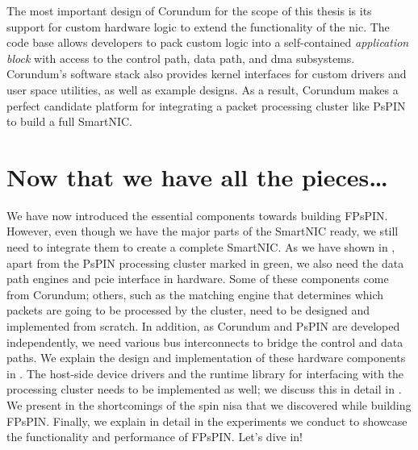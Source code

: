 The most important design of Corundum for the scope of this thesis is its support for custom hardware logic to extend the functionality of the \ac{nic}.  The code base allows developers to pack custom logic into a self-contained \emph{application block} with access to the control path, data path, and \ac{dma} subsystems.  Corundum's software stack also provides kernel interfaces for custom drivers and user space utilities, as well as example designs.  As a result, Corundum makes a perfect candidate platform for integrating a packet processing cluster like PsPIN to build a full SmartNIC.

\section*{Now that we have all the pieces\ldots}

We have now introduced the essential components towards building FPsPIN.  However, even though we have the major parts of the SmartNIC ready, we still need to integrate them to create a complete SmartNIC.  As we have shown in , apart from the PsPIN processing cluster marked in green, we also need the data path engines and \ac{pcie} interface in hardware.  Some of these components come from Corundum; others, such as the matching engine that determines which packets are going to be processed by the cluster, need to be designed and implemented from scratch.  In addition, as Corundum and PsPIN are developed independently, we need various bus interconnects to bridge the control and data paths.  We explain the design and implementation of these hardware components in .  The host-side device drivers and the runtime library for interfacing with the processing cluster needs to be implemented as well; we discuss this in detail in .  We present in  the shortcomings of the \ac{spin} \ac{nisa} that we discovered while building FPsPIN.  Finally, we explain in detail in  the experiments we conduct to showcase the functionality and performance of FPsPIN.  Let's dive in!